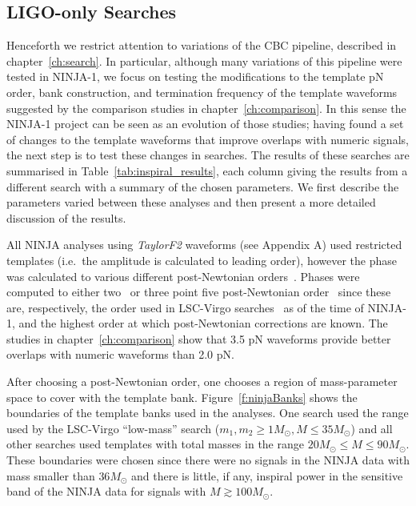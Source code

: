 \subsection{LIGO-only Searches}
\label{ssec:ninja1_ligo}

Henceforth we restrict attention to variations of the CBC pipeline,
described in chapter~\ref{ch:search}.  In particular, although many
variations of this pipeline were tested in NINJA-1, we focus on
testing the modifications to the template pN order, bank construction,
and termination frequency of the template waveforms suggested by the
comparison studies in chapter~\ref{ch:comparison}.  In this sense the
NINJA-1 project can be seen as an evolution of those studies; having
found a set of changes to the template waveforms that improve overlaps
with numeric signals, the next step is to test these changes in
searches.  The results of these searches are summarised in
Table~\ref{tab:inspiral_results}, each column giving the results from
a different search with a summary of the chosen parameters.  We first
describe the parameters varied between these analyses and then present
a more detailed discussion of the results.

All NINJA analyses using \emph{TaylorF2} waveforms (see Appendix A)
used restricted templates (i.e.~the amplitude is calculated to leading
order), however the phase was calculated to various different
post-Newtonian orders~\cite{Blanchet:2002av}. Phases were computed to
either two~\cite{Blanchet:1996pi,Blanchet:1995ez} or three point five
post-Newtonian
order~\cite{Blanchet:2001ax,PhysRevD.71.129902,Blanchet:2004ek} since
these are, respectively, the order used in LSC-Virgo
searches~\cite{Abbott:2009tt} as of the time of NINJA-1, and the
highest order at which post-Newtonian corrections are known.  The
studies in chapter~\ref{ch:comparison} show that 3.5 pN waveforms
provide better overlaps with numeric waveforms than 2.0 pN.

After choosing a post-Newtonian order, one chooses a region of
mass-parameter space to cover with the template bank.
Figure~\ref{f:ninjaBanks} shows the boundaries of the template banks
used in the analyses. One search used the range used by the LSC-Virgo
``low-mass'' search \cite{Abbott:2009tt} ($m_1,m_2 \ge  1 M_\odot, M
\le 35 M_{\odot}$) and all other searches used templates with total
masses in the range $20 M_\odot \le M \le 90 M_\odot$.  These
boundaries were chosen since there were no signals in the NINJA data
with mass smaller than $36 M_\odot$ and there is little, if any,
inspiral power in the sensitive band of the NINJA data for signals
with $M \gtrsim 100 M_\odot$.

